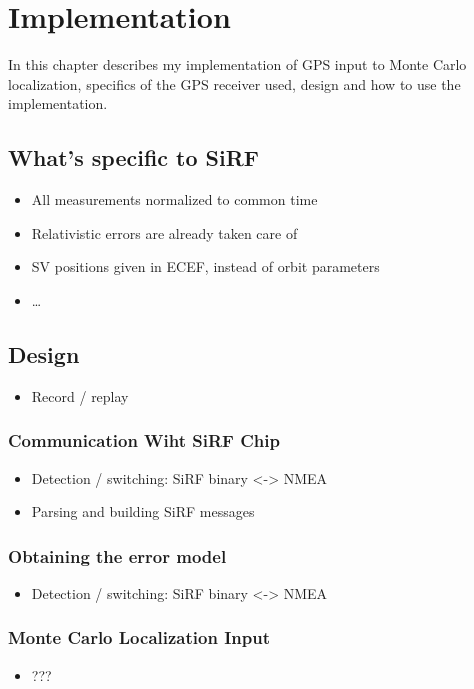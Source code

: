\chapter{Implementation}
\label{chap:implementation}

In this chapter describes my implementation of GPS input to Monte Carlo localization,
specifics of the GPS receiver used, design and how to use the implementation.

\section{What's specific to SiRF}
\begin{itemize}
\item All measurements normalized to common time
\item Relativistic errors are already taken care of
\item SV positions given in ECEF, instead of orbit parameters
\item \ldots
\end{itemize}

\section{Design}
\begin{itemize}
\item Record / replay
\end{itemize}

\subsection{Communication Wiht SiRF Chip}
\begin{itemize}
\item Detection / switching: SiRF binary <-> NMEA
\item Parsing and building SiRF messages
\end{itemize}

\subsection{Obtaining the error model}
\begin{itemize}
\item Detection / switching: SiRF binary <-> NMEA
\end{itemize}

\subsection{Monte Carlo Localization Input}
\begin{itemize}
\item ???
\end{itemize}

